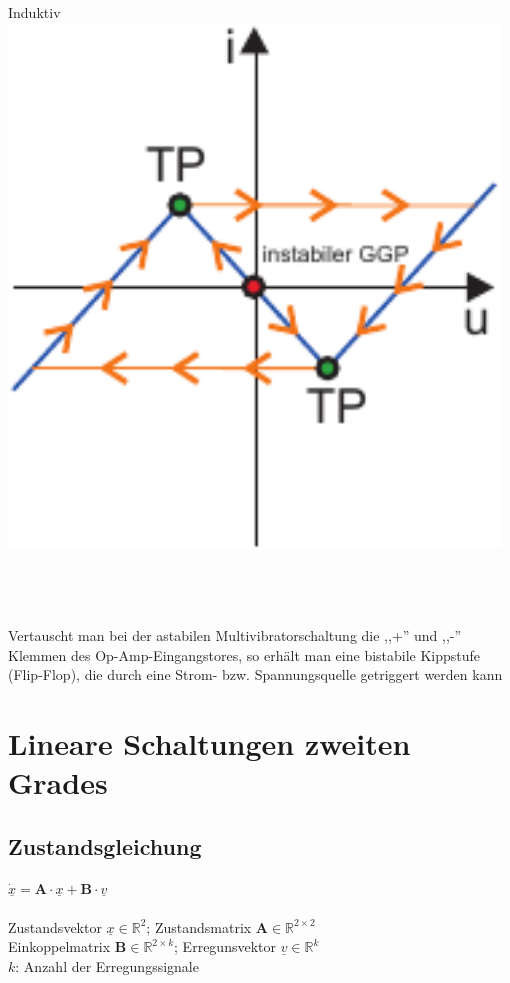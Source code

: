 \documentclass[a4paper,twocolumn,10pt]{article}
\begin{document}
\begin{minipage}[t]{0.23\textwidth}
Induktiv\\
\includegraphics[width=0.98\textwidth]{Grafiken/PfadSprung2}\\\\
\end{minipage}\\\\
Vertauscht man bei der astabilen Multivibratorschaltung die ,,+'' und ,,-'' Klemmen des Op-Amp-Eingangstores, so erhält man eine bistabile Kippstufe (Flip-Flop), die durch eine Strom- bzw. Spannungsquelle getriggert werden kann

\section*{Lineare Schaltungen zweiten Grades}
\subsection*{Zustandsgleichung}
$\underline{\dot x}=\textbf{A}\cdot \underline{x}+\textbf{B}\cdot \underline{v}$\\\\
Zustandsvektor $\underline{x}\in \mathbb{R}^{2}$; Zustandsmatrix $\textbf{A}\in \mathbb{R}^{2\times 2}$\\
Einkoppelmatrix $\textbf{B}\in \mathbb{R}^{2\times k}$; Erregunsvektor $\underline{v}\in \mathbb{R}^{k}$\\
$k$: Anzahl der Erregungssignale
\end{document}
